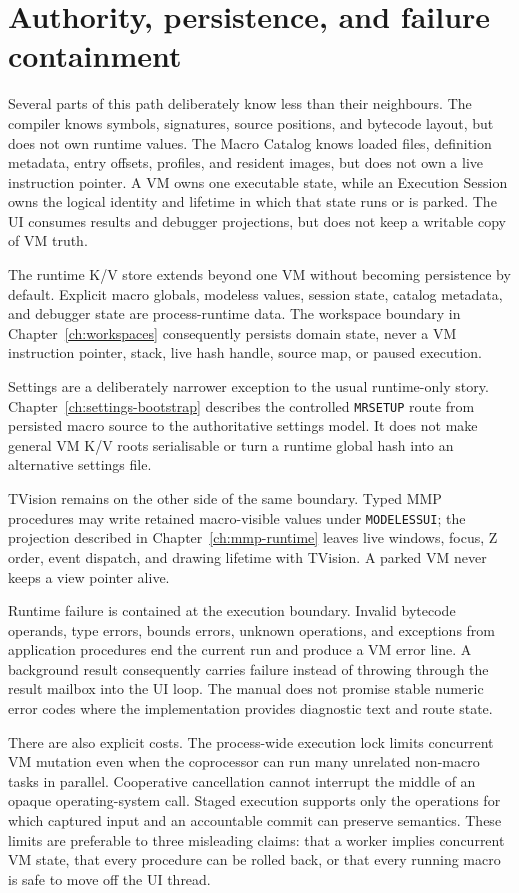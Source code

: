 \documentclass[a4paper,10pt,twoside,openany]{book}
\begin{document}
\section{Authority, persistence, and failure containment}

Several parts of this path deliberately know less than their neighbours. The
compiler knows symbols, signatures, source positions, and bytecode layout, but
does not own runtime values. The Macro Catalog knows loaded files, definition
metadata, entry offsets, profiles, and resident images, but does not own a live
instruction pointer. A VM owns one executable state, while an Execution
Session owns the logical identity and lifetime in which that state runs or is
parked. The UI consumes results and debugger projections, but does not keep a
writable copy of VM truth.

The runtime K/V store extends beyond one VM without becoming persistence by
default. Explicit macro globals, modeless values, session state, catalog
metadata, and debugger state are process-runtime data. The workspace boundary
in Chapter~\ref{ch:workspaces} consequently persists domain state, never a VM
instruction pointer, stack, live hash handle, source map, or paused execution.

Settings are a deliberately narrower exception to the usual runtime-only
story. Chapter~\ref{ch:settings-bootstrap} describes the controlled
\texttt{MRSETUP} route from persisted macro source to the authoritative
settings model. It does not make general VM K/V roots serialisable or turn a
runtime global hash into an alternative settings file.

TVision remains on the other side of the same boundary. Typed MMP procedures
may write retained macro-visible values under \texttt{MODELESSUI}; the
projection described in Chapter~\ref{ch:mmp-runtime} leaves live windows, focus, Z
order, event dispatch, and drawing lifetime with TVision. A parked VM never
keeps a view pointer alive.

Runtime failure is contained at the execution boundary. Invalid bytecode
operands, type errors, bounds errors, unknown operations, and exceptions from
application procedures end the current run and produce a VM error line. A
background result consequently carries failure instead of throwing through
the result mailbox into the UI loop. The manual does not promise stable
numeric error codes where the implementation provides diagnostic text and
route state.

There are also explicit costs. The process-wide execution lock limits
concurrent VM mutation even when the coprocessor can run many unrelated
non-macro tasks in parallel. Cooperative cancellation cannot interrupt the
middle of an opaque operating-system call. Staged execution supports only the
operations for which captured input and an accountable commit can preserve
semantics. These limits are preferable to three misleading claims: that a
worker implies concurrent VM state, that every procedure can be rolled back,
or that every running macro is safe to move off the UI thread.
\end{document}
